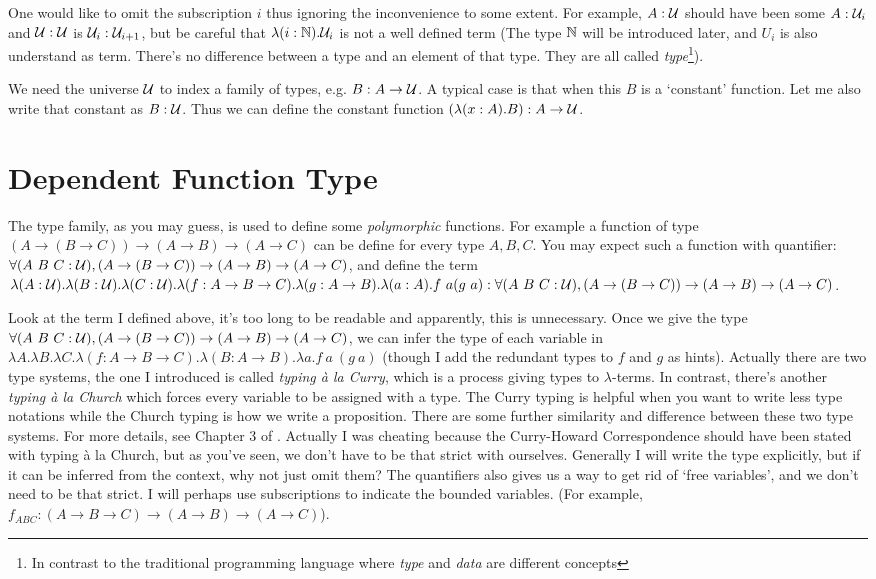 One would like to omit the subscription $i$ thus ignoring the 
inconvenience to some extent. For example, $A:\mathcal{U}$ should have been 
some $A:\mathcal{U}_i$ and $\mathcal{U}:\mathcal{U}$ is 
$\mathcal{U}_i:\mathcal{U}_{i+1}$, but be careful that 
$\lambda(i:\mathbb{N}). \mathcal{U}_i$ is not a well defined term (The type 
$\mathbb{N}$ will be introduced later, and $U_i$ is also understand as term.
There's no difference between a type and an element of that type. They
are all called {\it type}\footnote{In contrast to the traditional
programming language where {\it type} and {\it data} are different concepts}).

We need the universe $\mathcal{U}$ to index a family of types, e.g. 
$B:A\to\mathcal{U}$. A typical case is that when this $B$ is a `constant'
function. Let me also write that constant as $B:\mathcal{U}$. Thus we can define
the constant function $(\lambda(x:A).B):A\to \mathcal{U}$.


\section{Dependent Function Type}
The type family, as you may guess, is used to define some {\it polymorphic}
functions. For example a function of type $(A\to(B\to C))\to(A\to B)\to
(A\to C)$ can be define for every type $A, B, C$. You may expect such
a function with quantifier: $\forall (A\ B\ C: \mathcal{U}), 
(A\to(B\to C))\to(A\to B)\to (A\to C)$, and define the term
$\lambda (A:\universe).\lambda (B:\universe).\lambda (C:\universe).\lambda (f: A\to B\to C).
\lambda (g: A\to B).\lambda (a: A). f\ a (g\ a): \forall (A\ B\ C:\universe), 
(A\to(B\to C))\to(A\to B)\to (A\to C)$.

Look at the term I defined above, it's too long to be readable and apparently, 
this is unnecessary. Once we give the type $\forall (A\ B\ C:\mathcal{U}), 
(A\to(B\to C))\to(A\to B)\to (A\to C)$, we can infer the type of each 
variable in $\lambda A.\lambda B. \lambda C. \lambda (f: A\to B\to C). 
\lambda (B: A\to B).\lambda a. f\ a\ (g\ a)$ (though I add the redundant
types to $f$ and $g$ as hints). Actually there are two type systems, the
one I introduced is called {\it typing \`a la Curry}, which is a process
giving types to $\lambda$-terms. In contrast, there's another {\it typing
\`a la Church} which forces every variable to be assigned with a type.
The Curry typing is helpful when you want to write less type notations 
while the Church typing is how we write a proposition. There are some
further similarity and difference between these two type systems. For
more details, see Chapter 3 of \cite{Curry-Howard}. Actually I was
cheating because the Curry-Howard Correspondence should have been stated
with typing \`a la Church, but as you've seen, we don't have to be that 
strict with ourselves. Generally I will write the type explicitly, but if 
it can be inferred from the context, why not just omit them? The 
quantifiers also gives us a way to get rid of `free variables', and we 
don't need to be that strict. I will perhaps use subscriptions to 
indicate the bounded variables.
(For example, $f_{ABC}: (A\to B\to C)\to(A\to B)\to(A\to C)$).

